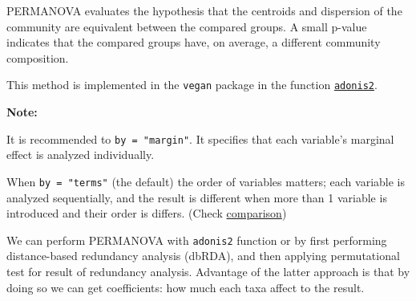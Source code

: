 \documentclass[
]{book}
\begin{document}
PERMANOVA evaluates the hypothesis that the centroids and dispersion
of the community are equivalent between the compared groups. A small
p-value indicates that the compared groups have, on average, a
different community composition.

This method is implemented in the \texttt{vegan} package in the function
\href{https://www.rdocumentation.org/packages/vegan/versions/2.4-2/topics/adonis}{\texttt{adonis2}}.

\textbf{Note:}

It is recommended to \texttt{by\ =\ "margin"}. It specifies that each variable's marginal
effect is analyzed individually.

When \texttt{by\ =\ "terms"} (the default) the order of variables matters;
each variable is analyzed sequentially, and the result is different when more than 1 variable is
introduced and their order is differs. (Check \href{https://microbiome.github.io/OMA/extras.html\#permanova-comparison}{comparison})

We can perform PERMANOVA with \texttt{adonis2} function or by first performing distance-based
redundancy analysis (dbRDA), and then applying permutational test for result of
redundancy analysis. Advantage of the latter approach is that by doing so we can get
coefficients: how much each taxa affect to the result.
\end{document}
